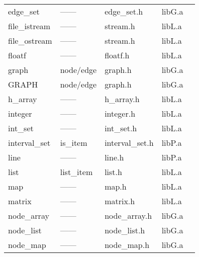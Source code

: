 \begin{tabular}{lllll}
edge\_set           &------          &edge\_set.h       &libG.a         &\pageref{Sets of Edges}\\
file\_istream       &------          &stream.h          &libL.a         &\pageref{File Input Streams}\\
file\_ostream       &------          &stream.h          &libL.a         &\pageref{File Output Streams}\\
floatf              &------          &floatf.h          &libL.a         &\pageref{A Floating Point Filter}\\
graph               &node/edge       &graph.h           &libG.a         &\pageref{Graphs}\\
GRAPH               &node/edge       &graph.h           &libG.a         &\pageref{Parameterized Graphs}\\
h\_array            &------          &h\_array.h        &libL.a         &\pageref{Hashing Arrays}\\
integer             &------          &integer.h         &libL.a         &\pageref{Integers of Arbitrary Length}\\
int\_set            &------          &int\_set.h        &libL.a         &\pageref{Integer Sets}\\
interval\_set       &is\_item        &interval\_set.h   &libP.a         &\pageref{Sets of Intervals}\\
line                &------          &line.h            &libP.a         &\pageref{Straight Lines}\\
list                &list\_item      &list.h            &libL.a         &\pageref{Linear Lists}\\
map                 &------          &map.h             &libL.a         &\pageref{Maps}\\
matrix              &------          &matrix.h          &libL.a         &\pageref{Real-Valued Matrices}\\
node\_array         &------          &node\_array.h     &libG.a         &\pageref{Node Arrays}\\
node\_list          &------          &node\_list.h       &libG.a         &\pageref{Lists of Nodes}\\
node\_map           &------          &node\_map.h        &libG.a         &\pageref{Node Maps}\\
\end{tabular}

